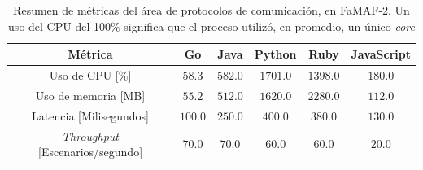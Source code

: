 \documentclass[11pt]{article}
\newcommand{\english}[1]{\textit{#1}}
\begin{document}
\begin{table}[H]
\centering
\begin{tabular}{|c|c|c|c|c|c|}
\hline
Métrica       & Go   & Java & Python & Ruby & JavaScript \\ \hline
Uso de CPU [\%]         & $58.3$ & $582.0$  & $1701.0$   & $1398.0$ & $180.0$        \\ \hline
Uso de memoria [MB]   & $55.2$ & $512.0$  & $1620.0$   & $2280.0$ & $112.0$        \\ \hline
Latencia [Milisegundos]   & $100.0$  & $250.0$  & $400.0$    & $380.0$  & $130.0$        \\ \hline
\english{Throughput} [Escenarios/segundo] & $70.0$   & $70.0$   & $60.0$     & $60.0$   & $20.0$         \\ \hline
\end{tabular}
\caption{Resumen de métricas del área de protocolos de comunicación, en FaMAF-2. Un uso del CPU del 100\% significa que el proceso utilizó, en promedio, un único \english{core} }
\label{tab:http:famaf_1}
\end{table}
\end{document}
